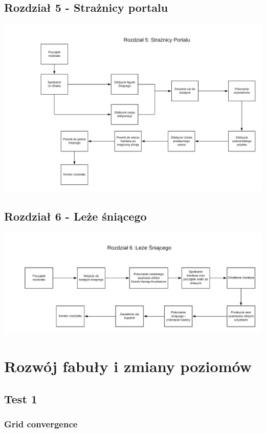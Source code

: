 \documentclass[11pt,polish, openany]{book}
\begin{document}
\section{Rozdział 5 - Strażnicy portalu}
\begin{center}
	\includegraphics[scale=0.16, angle=90]{5}
\end{center}
\section{Rozdział 6 - Leże śniącego}
\begin{center}
	\includegraphics[scale=0.16, angle=90]{6}
\end{center}
\chapter{Rozwój fabuły i zmiany poziomów}\label{chapt:results}
\section{Test 1}
\subsection{Grid convergence}
\end{document}
